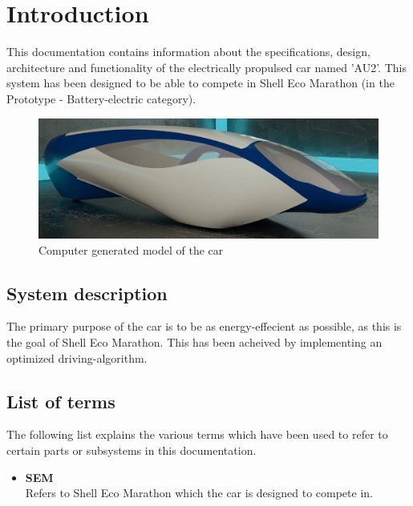 \chapter{Introduction}
This documentation contains information about the specifications, design, architecture and functionality of the electrically propulsed car named 'AU2'. This system has been designed to be able to compete in Shell Eco Marathon (in the Prototype - Battery-electric category).

\begin{figure}[H]
	\centering
	\includegraphics[width=0.5\linewidth]{Introduction/Model}
	\caption{Computer generated model of the car}
	\label{fig:System_model}
\end{figure}

\section{System description}
The primary purpose of the car is to be as energy-effecient as possible, as this is the goal of Shell Eco Marathon. This has been acheived by implementing an optimized driving-algorithm.

\section{List of terms}
The following list explains the various terms which have been used to refer to certain parts or subsystems in this documentation.

\begin{itemize}
	\item \textbf{SEM}\\
	Refers to Shell Eco Marathon which the car is designed to compete in.
\end{itemize}